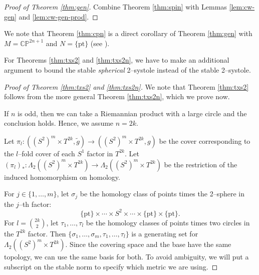 \documentclass[12pt]{amsart}
\theoremstyle{definition}
\numberwithin{equation}{section}
\newcommand{\CP}{\mathbb{C}\mathbb{P}}
\begin{document}
\begin{proof}[Proof of Theorem \ref{thm:gen}]
Combine Theorem \ref{thm:spin} with Lemmas \ref{lem:cw-gen} and \ref{lem:cw-gen-prod}.
\end{proof}

We note that Theorem \ref{thm:cpn} is a direct corollary of Theorem \ref{thm:gen} with $M = \CP^{2n+1}$ and $N = \{\mathrm{pt}\}$ (see \cite[Chapter II, Example 2.4]{Lawson-Michelson:spin}).

For Theorems \ref{thm:txs2} and \ref{thm:txs2n}, we have to make an additional argument to bound the stable \emph{spherical} 2--systole instead of the stable 2--systole.

\begin{proof}[Proof of Theorem \ref{thm:txs2} and \ref{thm:txs2n}]
We note that Theorem \ref{thm:txs2} follows from the more general Theorem \ref{thm:txs2n}, which we prove now.

If $n$ is odd, then we can take a Riemannian product with a large circle and the conclusion holds. Hence, we assume $n = 2k$.

Let $\pi_l: ((S^2)^m \times T^{2k}, \tilde{g}) \to ((S^2)^m \times T^{2k}, g)$ be the cover corresponding to the $l$--fold cover of each $S^1$ factor in $T^{2k}$. Let $(\pi_l)_* : \Lambda_2((S^2)^m \times T^{2k}) \to \Lambda_2((S^2)^m \times T^{2k})$ be the restriction of the induced homomorphism on homology.

For $j \in \{1, \hdots, m\}$, let $\sigma_j$ be the homology class of points times the 2--sphere in the $j$--th factor:
\[ \{\mathrm{pt}\} \times \cdots \times S^2 \times \cdots \times \{\mathrm{pt}\} \times \{\mathrm{pt}\}. \]
For $l = \binom{2k}{2}$, let $\tau_1, \hdots, \tau_l$ be the homology classes of points times two circles in the $T^{2k}$ factor. Then $\{\sigma_1, \hdots, \sigma_m, \tau_1, \hdots, \tau_l\}$ is a generating set for $\Lambda_2((S^2)^m \times T^{2k})$. Since the covering space and the base have the same topology, we can use the same basis for both. To avoid ambiguity, we will put a subscript on the stable norm to specify which metric we are using.


\end{proof}
\end{document}
